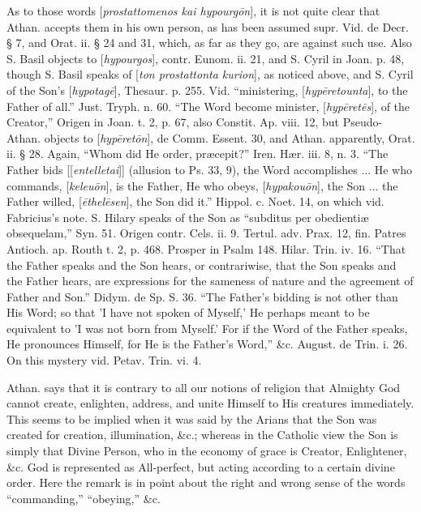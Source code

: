 As
to those words [\emph{prostattomenos kai hypourg\={o}n}], it is not
quite clear that Athan. accepts them in his own person, as has been
assumed supr. Vid. de Decr. § 7, and Orat. ii. § 24 and 31, which,
as far as they go, are against such use. Also S. Basil objects to [\emph{hypourgos}],
contr. Eunom. ii. 21, and S. Cyril in Joan. p. 48, though S. Basil
speaks of [\emph{ton prostattonta kurion}], as noticed above, and S.
Cyril of the Son's [\emph{hypotag\={e}}], Thesaur. p. 255. Vid. ``ministering,
[\emph{hyp\={e}retounta}], to the Father of all.'' Just. Tryph. n.
60. ``The Word become minister, [\emph{hyp\={e}ret\={e}s}], of
the Creator,'' Origen in Joan. t. 2, p. 67, also Constit. Ap.
viii. 12, but Pseudo-Athan. objects to [\emph{hyp\={e}ret\={o}n}],
de Comm. Essent. 30, and Athan. apparently, Orat. ii. § 28. Again, ``Whom
did He order, præcepit?'' Iren. Hær. iii. 8, n. 3. ``The Father bids
[[\emph{entelletai}]] (allusion to Ps. 33, 9), the Word accomplishes
... He who commands, [\emph{keleu\={o}n}], is the Father, He who
obeys, [\emph{hypakou\={o}n}], the Son ... the Father willed, [\emph{\={e}thel\={e}sen}],
the Son did it.'' Hippol. c. Noet. 14, on which vid. Fabricius's note.
S. Hilary speaks of the Son as ``subditus per obedientiæ obsequelam,''
Syn. 51. Origen contr. Cels. ii. 9. Tertul. adv. Prax. 12, fin. Patres
Antioch. ap. Routh t. 2, p. 468. Prosper in Psalm 148. Hilar. Trin.
iv. 16. ``That the Father speaks and the Son hears, or contrariwise,
that the Son speaks and the Father hears, are expressions for the
sameness of nature and the agreement of Father and Son.'' Didym. de Sp.
S. 36. ``The Father's bidding is not other than His Word; so that 'I
have not spoken of Myself,' He perhaps meant to be equivalent to 'I
was not born from Myself.' For if the Word of the Father speaks, He
pronounces Himself, for He is the Father's Word,'' \&c. August. de
Trin. i. 26. On this mystery vid. Petav. Trin. vi. 4.

Athan.
says that it is contrary to all our notions of religion that Almighty
God cannot create, enlighten, address, and unite Himself to His
creatures immediately. This seems to be implied when it was said by
the Arians that the Son was created for creation, illumination,
\&c.; whereas in the Catholic view the Son is simply that Divine
Person, who in the economy of grace is Creator, Enlightener, \&c.
God is represented as All-perfect, but acting according to a
certain divine order. Here the remark is in point about the right and
wrong sense of the words ``commanding,'' ``obeying,'' \&c.

